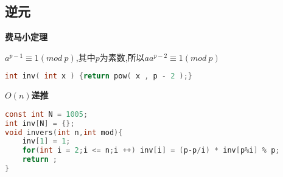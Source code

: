\subsection{逆元}
\textbf{费马小定理}

$a^{p-1} \equiv 1 (mod\ p)$,其中$p$为素数,所以$aa^{p-2}\equiv 1 (mod\ p)$
\begin{lstlisting}[language = c]
int inv( int x ) {return pow( x , p - 2 );}
\end{lstlisting}

\textbf{$O(n)$递推}

\begin{lstlisting}[language = c]
const int N = 1005;
int inv[N] = {};
void invers(int n,int mod){
    inv[1] = 1;
    for(int i = 2;i <= n;i ++) inv[i] = (p-p/i) * inv[p%i] % p;
    return ;
}
\end{lstlisting}